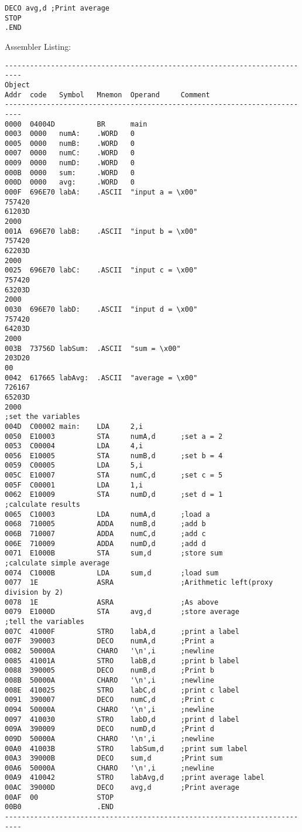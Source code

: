 \documentclass[a4paper,man,natbib]{apa6}
\begin{document}
{{{{\begin{verbatim}
DECO avg,d ;Print average
STOP
.END	
	\end{verbatim}
Assembler Listing:
{\renewcommand\fcolorbox[4][]{\textcolor{black}{\strut#4}}
	\begin{verbatim}
--------------------------------------------------------------------------
Object
Addr  code   Symbol   Mnemon  Operand     Comment
--------------------------------------------------------------------------
0000  04004D          BR      main        
0003  0000   numA:    .WORD   0           
0005  0000   numB:    .WORD   0           
0007  0000   numC:    .WORD   0           
0009  0000   numD:    .WORD   0           
000B  0000   sum:     .WORD   0           
000D  0000   avg:     .WORD   0           
000F  696E70 labA:    .ASCII  "input a = \x00"
757420 
61203D 
2000   
001A  696E70 labB:    .ASCII  "input b = \x00"
757420 
62203D 
2000   
0025  696E70 labC:    .ASCII  "input c = \x00"
757420 
63203D 
2000   
0030  696E70 labD:    .ASCII  "input d = \x00"
757420 
64203D 
2000   
003B  73756D labSum:  .ASCII  "sum = \x00"
203D20 
00     
0042  617665 labAvg:  .ASCII  "average = \x00"
726167 
65203D 
2000   
;set the variables
004D  C00002 main:    LDA     2,i         
0050  E10003          STA     numA,d      ;set a = 2
0053  C00004          LDA     4,i         
0056  E10005          STA     numB,d      ;set b = 4
0059  C00005          LDA     5,i         
005C  E10007          STA     numC,d      ;set c = 5
005F  C00001          LDA     1,i         
0062  E10009          STA     numD,d      ;set d = 1
;calculate results
0065  C10003          LDA     numA,d      ;load a
0068  710005          ADDA    numB,d      ;add b
006B  710007          ADDA    numC,d      ;add c
006E  710009          ADDA    numD,d      ;add d
0071  E1000B          STA     sum,d       ;store sum
;calculate simple average
0074  C1000B          LDA     sum,d       ;load sum
0077  1E              ASRA                ;Arithmetic left(proxy division by 2)
0078  1E              ASRA                ;As above
0079  E1000D          STA     avg,d       ;store average
;tell the variables
007C  41000F          STRO    labA,d      ;print a label
007F  390003          DECO    numA,d      ;Print a
0082  50000A          CHARO   '\n',i      ;newline
0085  41001A          STRO    labB,d      ;print b label
0088  390005          DECO    numB,d      ;Print b
008B  50000A          CHARO   '\n',i      ;newline
008E  410025          STRO    labC,d      ;print c label
0091  390007          DECO    numC,d      ;Print c
0094  50000A          CHARO   '\n',i      ;newline
0097  410030          STRO    labD,d      ;print d label
009A  390009          DECO    numD,d      ;Print d
009D  50000A          CHARO   '\n',i      ;newline
00A0  41003B          STRO    labSum,d    ;print sum label
00A3  39000B          DECO    sum,d       ;Print sum
00A6  50000A          CHARO   '\n',i      ;newline
00A9  410042          STRO    labAvg,d    ;print average label
00AC  39000D          DECO    avg,d       ;Print average
00AF  00              STOP                
00B0                  .END                  
--------------------------------------------------------------------------



\end{verbatim}}}}}}
\end{document}
